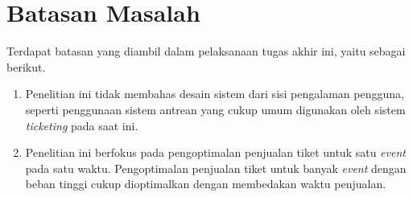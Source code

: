 \section{Batasan Masalah}
\label{sec:batasan-masalah}

Terdapat batasan yang diambil dalam pelaksanaan tugas akhir ini, yaitu sebagai berikut.

\begin{enumerate}
  \item Penelitian ini tidak membahas desain sistem dari sisi pengalaman pengguna, seperti penggunaan sistem antrean yang cukup umum digunakan oleh sistem \textit{ticketing} pada saat ini.
  \item Penelitian ini berfokus pada pengoptimalan penjualan tiket untuk satu \textit{event} pada satu waktu. Pengoptimalan penjualan tiket untuk banyak \textit{event} dengan beban tinggi cukup dioptimalkan dengan membedakan waktu penjualan.
\end{enumerate}

